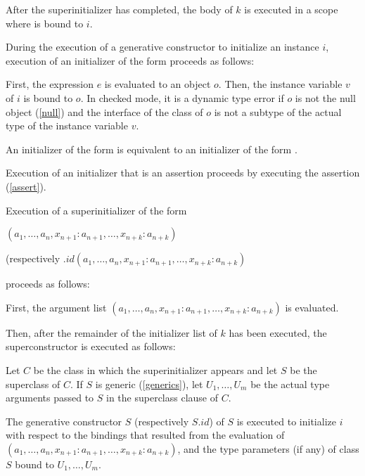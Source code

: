 \documentclass{article}
\begin{document}
\LMHash{}
After the superinitializer has completed, the body of $k$ is executed in a scope where \THIS{} is bound to $i$.


\LMHash{}
During the execution of a generative constructor to initialize an instance $i$,
execution of an initializer of the form 
proceeds as follows:

\LMHash{}
First, the expression $e$ is evaluated to an object $o$.
Then, the instance variable $v$ of $i$ is bound to $o$.
In checked mode, it is a dynamic type error if $o$ is not the null object (\ref{null}) and the interface of the class of $o$ is not a subtype of the actual type of the instance variable $v$.

\LMHash{}
An initializer of the form  is equivalent to an initializer of the form .

\LMHash{}
Execution of an initializer that is an assertion proceeds by executing the assertion (\ref{assert}).

\LMHash{}
Execution of a superinitializer of the form

\SUPER{}$(a_1, \ldots, a_n, x_{n+1}: a_{n+1}, \ldots, x_{n+k}: a_{n+k})$

(respectively \SUPER{}$.id(a_1, \ldots, a_n, x_{n+1}: a_{n+1}, \ldots, x_{n+k}: a_{n+k})$

proceeds as follows:

\LMHash{}
First, the argument list $(a_1, \ldots, a_n, x_{n+1}: a_{n+1}, \ldots, x_{n+k}: a_{n+k})$ is evaluated.

\LMHash{}
Then, after the remainder of the initializer list of $k$ has been executed,
the superconstructor is executed as follows:

\LMHash{}
Let $C$ be the class in which the superinitializer appears and let $S$ be the superclass of $C$.
If $S$ is generic (\ref{generics}), let $U_1, \ldots, U_m$ be the actual type arguments passed to $S$ in the superclass clause of $C$.

\LMHash{}
The generative constructor $S$ (respectively $S.id$) of $S$ is executed
to initialize $i$ with respect to the bindings that resulted from the evaluation of
$(a_1, \ldots , a_n, x_{n+1}: a_{n+1}, \ldots , x_{n+k}: a_{n+k})$,
and the type parameters (if any) of class $S$ bound to $U_1, \ldots, U_m$.
\end{document}
